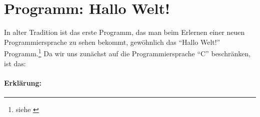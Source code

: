 \section{Programm: Hallo Welt!}
\label{sec:c:hallo-welt}

In alter Tradition ist das erste Programm, das man beim Erlernen einer neuen Programmiersprache zu sehen bekommt, gewöhnlich das ``Hallo Welt!'' Programm.\footnote{siehe \cite{wikipedia:hallo-welt}} 
Da wir uns zunächst auf die Programmiersprache ``C'' beschränken, ist das:
    

\paragraph{Erklärung:}

